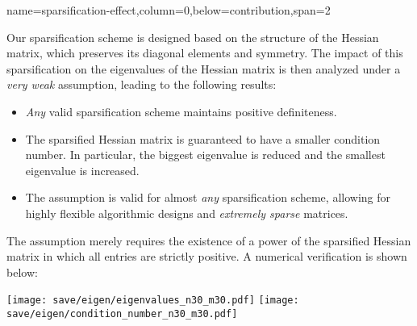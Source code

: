 {name=sparsification-effect,column=0,below=contribution,span=2}
{
    Our sparsification scheme is designed based on the structure of the Hessian matrix, which preserves its diagonal elements and symmetry. The impact of this sparsification on the eigenvalues of the Hessian matrix is then analyzed under a \emph{very weak} assumption, leading to the following results:
    \begin{itemize}
        \item \emph{Any} valid sparsification scheme maintains positive definiteness.
        \item The sparsified Hessian matrix is guaranteed to have a smaller condition number. In particular, the biggest eigenvalue is reduced and the smallest eigenvalue is increased.
        \item The assumption is valid for almost \emph{any} sparsification scheme, allowing for highly flexible algorithmic designs and \emph{extremely sparse} matrices.
    \end{itemize}
    The assumption merely requires the existence of a power of the sparsified Hessian matrix in which all entries are strictly positive. A numerical verification is shown below:

    \vspace{0.5em}

    \begin{center}
    \texttt{[image: save/eigen/eigenvalues\_n30\_m30.pdf]}
    \hfill
    \texttt{[image: save/eigen/condition\_number\_n30\_m30.pdf]}
    \end{center}
}
